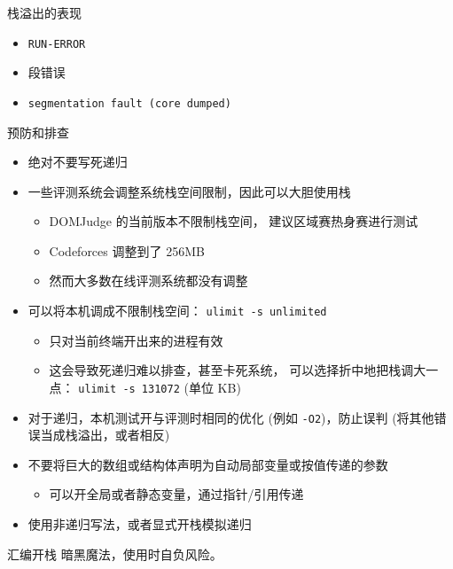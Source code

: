 \documentclass[10pt,mathserif]{beamer}
\begin{document}
\begin{frame}{栈溢出的表现}
	\begin{itemize}
		\item \lstinline{RUN-ERROR}
		\item 段错误
		\item \lstinline{segmentation fault (core dumped)}
	\end{itemize}
\end{frame}

\begin{frame}{预防和排查}
	\begin{itemize}
		\item 绝对不要写死递归
		\item 一些评测系统会调整系统栈空间限制，因此可以大胆使用栈
			\begin{itemize}
				\item DOMJudge 的当前版本不限制栈空间，
					建议区域赛热身赛进行测试
				\item Codeforces 调整到了 256MB
				\item 然而大多数在线评测系统都没有调整
			\end{itemize}
		\item 可以将本机调成不限制栈空间：
			\lstinline|ulimit -s unlimited|
			\begin{itemize}
				\item 只对当前终端开出来的进程有效
				\item 这会导致死递归难以排查，甚至卡死系统，
					可以选择折中地把栈调大一点：
					\lstinline|ulimit -s 131072| (单位 KB)
			\end{itemize}
		\item 对于递归，本机测试开与评测时相同的优化
			(例如 \lstinline|-O2|)，防止误判
			(将其他错误当成栈溢出，或者相反)
		\item 不要将巨大的数组或结构体声明为自动局部变量或按值传递的参数
			\begin{itemize}
				\item 可以开全局或者静态变量，通过指针/引用传递
			\end{itemize}
		\item 使用非递归写法，或者显式开栈模拟递归
	\end{itemize}
\end{frame}

\begin{frame}{汇编开栈}
	暗黑魔法，使用时自负风险。
	
\end{frame}
\end{document}
